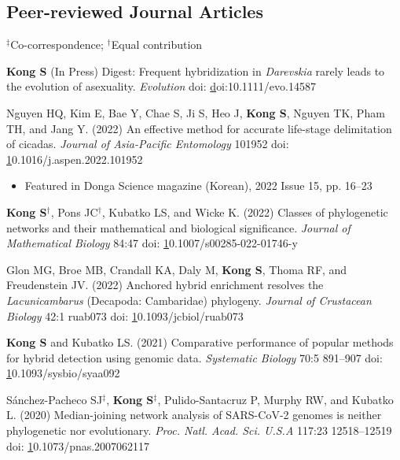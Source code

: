 \documentclass[11pt]{article}
\begin{document}
\pagebreak

\subsection*{Peer-reviewed Journal Articles}
$^\ddag$Co-correspondence; $^\dag$Equal contribution
\begin{etaremune}

\item \textbf{Kong S} (In Press) Digest: Frequent hybridization in \textit{Darevskia} rarely leads to the evolution of asexuality. \textit{Evolution} doi: \href{doi:10.1111/evo.14587}doi:10.1111/evo.14587

\item Nguyen HQ, Kim E, Bae Y, Chae S, Ji S, Heo J, \textbf{Kong S}, Nguyen TK, Pham TH, and Jang Y. (2022) An effective method for accurate life-stage delimitation of cicadas. \textit{Journal of Asia-Pacific Entomology} 101952 doi: \href{https://doi.org/10.1016/j.aspen.2022.101952}10.1016/j.aspen.2022.101952
	\begin{itemize}\item Featured in Donga Science magazine (Korean), 2022 Issue 15, pp. 16--23 \end{itemize}

\item \textbf{Kong S}$^\dag$, Pons JC$^\dag$, Kubatko LS, and Wicke K. (2022) Classes of phylogenetic networks and their mathematical and biological significance. \textit{Journal of Mathematical Biology} 84:47 doi: \href{https://doi.org/10.1007/s00285-022-01746-y}10.1007/s00285-022-01746-y

\item Glon MG, Broe MB, Crandall KA, Daly M, \textbf{Kong S}, Thoma RF, and Freudenstein JV. (2022) Anchored hybrid enrichment resolves the \textit{Lacunicambarus} (Decapoda: Cambaridae) phylogeny. \textit{Journal of Crustacean Biology} 42:1 ruab073 doi: \href{https://doi.org/10.1093/jcbiol/ruab073}10.1093/jcbiol/ruab073

\item \textbf{Kong S} and Kubatko LS. (2021) Comparative performance of popular methods for hybrid detection using genomic data. \textit {Systematic Biology} 70:5 891–907 doi: \href{https://doi.org/10.1093/sysbio/syaa092}10.1093/sysbio/syaa092

\item  Sánchez-Pacheco SJ{$^\ddag$}, \textbf{Kong S}{$^\ddag$}, Pulido-Santacruz P, Murphy RW, and Kubatko L. (2020) Median-joining network analysis of SARS-CoV-2 genomes is neither phylogenetic nor evolutionary. \textit{Proc. Natl. Acad. Sci. U.S.A} 117:23 12518–12519 doi: \href{https://doi.org/10.1073/pnas.2007062117}10.1073/pnas.2007062117
	

\end{etaremune}
\end{document}
